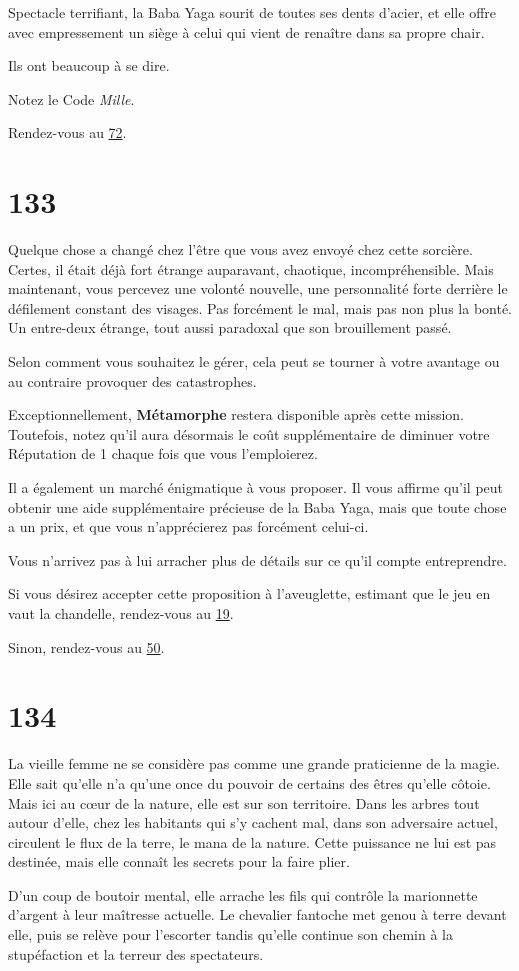 \documentclass{report}
\newcommand{\gsection}[1]{
    \section{#1}
    \label{section-#1}
}
\newcommand{\glink}[1]{\hyperref[section-#1]{#1}}
\newcommand{\hero}[1]{\textbf{#1}}
\begin{document}
Spectacle terrifiant, la Baba Yaga sourit de toutes ses dents d'acier, et elle offre avec empressement un siège à celui qui vient de renaître dans sa propre chair.

Ils ont beaucoup à se dire.

Notez le Code \emph{Mille}.

Rendez-vous au \glink{72}.

\gsection{133}

Quelque chose a changé chez l'être que vous avez envoyé chez cette sorcière. Certes, il était déjà fort étrange auparavant, chaotique, incompréhensible. Mais maintenant, vous percevez une volonté nouvelle, une personnalité forte derrière le défilement constant des visages. Pas forcément le mal, mais pas non plus la bonté. Un entre-deux étrange, tout aussi paradoxal que son brouillement passé.

Selon comment vous souhaitez le gérer, cela peut se tourner à votre avantage ou au contraire provoquer des catastrophes.

Exceptionnellement, \hero{Métamorphe} restera disponible après cette mission. Toutefois, notez qu'il aura désormais le coût supplémentaire de diminuer votre Réputation de 1 chaque fois que vous l'emploierez.

Il a également un marché énigmatique à vous proposer. Il vous affirme qu'il peut obtenir une aide supplémentaire précieuse de la Baba Yaga, mais que toute chose a un prix, et que vous n'apprécierez pas forcément celui-ci.

Vous n'arrivez pas à lui arracher plus de détails sur ce qu'il compte entreprendre.

Si vous désirez accepter cette proposition à l'aveuglette, estimant que le jeu en vaut la chandelle, rendez-vous au \glink{19}.

Sinon, rendez-vous au \glink{50}.

\gsection{134}

La vieille femme ne se considère pas comme une grande praticienne de la magie. Elle sait qu'elle n'a qu'une once du pouvoir de certains des êtres qu'elle côtoie. Mais ici au cœur de la nature, elle est sur son territoire. Dans les arbres tout autour d'elle, chez les habitants qui s'y cachent mal, dans son adversaire actuel, circulent le flux de la terre, le mana de la nature. Cette puissance ne lui est pas destinée, mais elle connaît les secrets pour la faire plier.

D'un coup de boutoir mental, elle arrache les fils qui contrôle la marionnette d'argent à leur maîtresse actuelle. Le chevalier fantoche met genou à terre devant elle, puis se relève pour l'escorter tandis qu'elle continue son chemin à la stupéfaction et la terreur des spectateurs.
\end{document}
